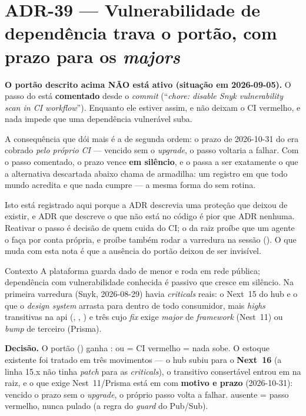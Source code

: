 \section{ADR-39 --- Vulnerabilidade de dependência trava o portão, com prazo para os \emph{majors}}
\label{adr:snyk-no-portao}

\begin{atencao}
\textbf{O portão descrito acima NÃO está ativo (situação em 2026-09-05).} O
passo  do  está \textbf{comentado} desde o \emph{commit}
 (\enquote{\emph{chore: disable Snyk vulnerability scan in CI
workflow}}). Enquanto ele estiver assim,  e  não deixam o
CI vermelho, e nada impede que uma dependência vulnerável suba.

A consequência que dói mais é a de segunda ordem: o prazo de 2026-10-31 do
 era cobrado \emph{pelo próprio CI} --- vencido sem o
\emph{upgrade}, o passo voltaria a falhar. Com o passo comentado, o prazo vence
\textbf{em silêncio}, e o  passa a ser exatamente o que a alternativa
descartada abaixo chama de armadilha: um registro em que todo mundo acredita e
que nada cumpre --- a mesma forma do  sem rotina.

Isto está registrado aqui porque a ADR descrevia uma proteção que deixou de
existir, e ADR que descreve o que não está no código é pior que ADR nenhuma.
Reativar o passo é decisão de quem cuida do CI; o  da raiz
proíbe que um agente o faça por conta própria, e proíbe também rodar a varredura
na sessão (). O que muda com esta nota é que a ausência do portão
deixou de ser invisível.
\end{atencao}

\begin{especificacao}{Contexto}
A plataforma guarda dado de menor e roda em rede pública; dependência com
vulnerabilidade conhecida é passivo que cresce em silêncio. Na primeira
varredura (Snyk, 2026-08-29) havia \emph{criticals} reais: o Next~15 do hub e o
 que o \emph{design system} arrasta para dentro de todo
consumidor, mais \emph{highs} transitivas na api (, ,
) e três cujo \emph{fix} exige \emph{major} de \emph{framework}
(Nest~11) ou \emph{bump} de terceiro (Prisma).
\end{especificacao}

\textbf{Decisão.} O portão () ganha
:  ou
 = CI vermelho = nada sobe. O estoque existente foi tratado em
três movimentos --- o hub subiu para o \textbf{Next~16} (a linha 15.x não tinha
\emph{patch} para as \emph{criticals}), o transitivo consertável entrou em
 na raiz, e o que exige Nest~11/Prisma está em
 com \textbf{motivo e prazo} (2026-10-31): vencido o prazo
sem o \emph{upgrade}, o próprio passo volta a falhar.  ausente
= passo vermelho, nunca pulado (a regra do \emph{guard} do Pub/Sub).

